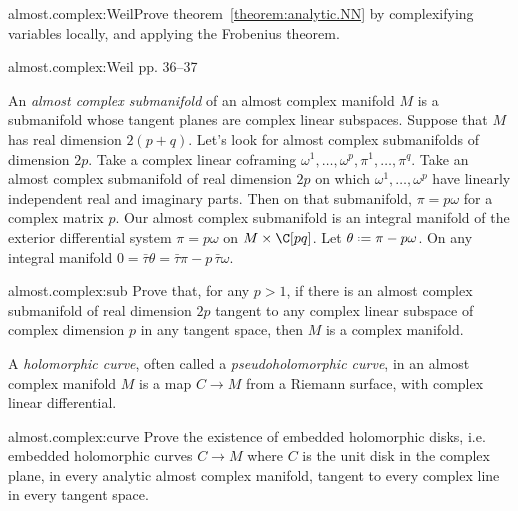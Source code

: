 \begin{problem*}{almost.complex:Weil}Prove theorem~\vref{theorem:analytic.NN} by complexifying variables locally, and applying the Frobenius theorem.\end{problem*}
\begin{answer}{almost.complex:Weil}
\cite{Weil:1958} pp. 36--37
\end{answer}
%
An \emph{almost complex submanifold} of an almost complex manifold \(M\) is a submanifold whose tangent planes are complex linear subspaces.
Suppose that \(M\) has real dimension \(2(p+q)\).
Let's look for almost complex submanifolds of dimension \(2p\).
Take a complex linear coframing \(\omega^1,\dots,\omega^p,\pi^1,\dots,\pi^q\).
Take an almost complex submanifold of real dimension \(2p\) on which \(\omega^1,\dots,\omega^p\) have linearly independent real and imaginary parts.
Then on that submanifold, \(\pi=p\omega\) for a complex matrix \(p\).
Our almost complex submanifold is an integral manifold of the exterior differential system \(\pi=p\omega\) on \(M\times\C[pq]\).
Let \(\theta\defeq\pi-p\omega\).
On any integral manifold \(0=\bar\tau\theta=\bar\tau\pi-p \, \bar\tau\omega\).
\begin{problem}{almost.complex:sub}
Prove that, for any \(p>1\), if there is an almost complex submanifold of real dimension \(2p\) tangent to any complex linear subspace of complex dimension \(p\) in any tangent space, then \(M\) is a complex manifold.
\end{problem}
A \emph{holomorphic curve}, often called a \emph{pseudoholomorphic curve}, in an almost complex manifold \(M\) is a map \(C \to M\) from a Riemann surface, with complex linear differential.
\begin{problem}{almost.complex:curve}
Prove the existence of embedded holomorphic disks, i.e. embedded holomorphic curves \(C \to M\) where \(C\) is the unit disk in the complex plane, in every analytic almost complex manifold, tangent to every complex line in every tangent space.
\end{problem}